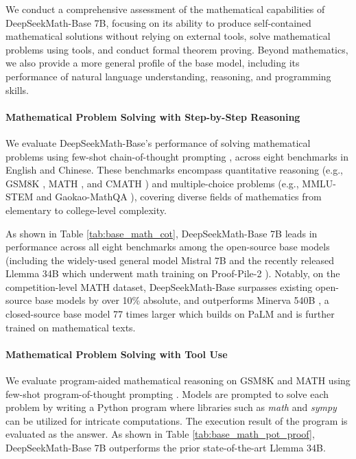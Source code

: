 We conduct a comprehensive assessment of the mathematical capabilities of DeepSeekMath-Base 7B, focusing on its ability to produce self-contained mathematical solutions without relying on external tools, solve mathematical problems using tools, and conduct formal theorem proving. Beyond mathematics, we also provide a more general profile of the base model, including its performance of natural language understanding, reasoning, and programming skills.

\paragraph{Mathematical Problem Solving with Step-by-Step Reasoning}

We evaluate DeepSeekMath-Base's performance of solving mathematical problems using few-shot chain-of-thought prompting \citep{cot}, across eight benchmarks in English and Chinese. These benchmarks encompass quantitative reasoning (e.g., GSM8K \citep{gsm8k}, MATH \citep{MATH}, and CMATH \citep{wei2023cmath}) and multiple-choice problems (e.g., MMLU-STEM \citep{mmlu} and Gaokao-MathQA \citep{agieval}), covering diverse fields of mathematics from elementary to college-level complexity.

As shown in Table \ref{tab:base_math_cot}, DeepSeekMath-Base 7B leads in performance across all eight benchmarks among the open-source base models (including the widely-used general model Mistral 7B \citep{mistral} and the recently released Llemma 34B \citep{llemma} which underwent math training on Proof-Pile-2 \citep{llemma}). Notably, on the competition-level MATH dataset, DeepSeekMath-Base surpasses existing open-source base models by over 10\% absolute, and outperforms Minerva 540B \citep{minerva}, a closed-source base model 77 times larger which builds on PaLM \citep{palm} and is further trained on mathematical texts.

\paragraph{Mathematical Problem Solving with Tool Use} We evaluate program-aided mathematical reasoning on GSM8K and MATH using few-shot program-of-thought prompting \citep{pot,pal}. Models are prompted to solve each problem by writing a Python program where libraries such as \textit{math} and \textit{sympy} can be utilized for intricate computations. The execution result of the program is evaluated as the answer. As shown in Table \ref{tab:base_math_pot_proof}, DeepSeekMath-Base 7B outperforms the prior state-of-the-art Llemma 34B.

